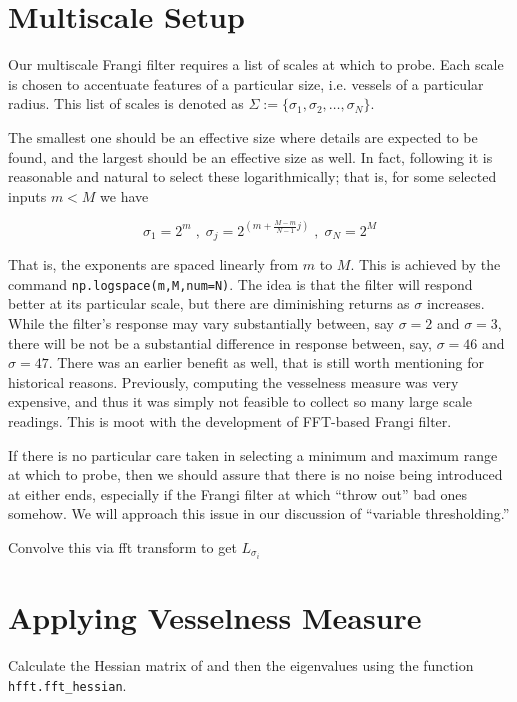 	
\section{Multiscale Setup}

	Our multiscale Frangi filter requires a list of scales at which to probe. Each scale is chosen to accentuate features of a particular size, i.e. vessels of a particular radius. This  list of scales is denoted as $\Sigma := \{ \sigma_1, \sigma_2, \dots, \sigma_N\}$. 
	 
	The smallest one should be an effective size where details are expected to be found, and the largest should be an effective size as well. In fact, following \cite{Koenderink} it is reasonable and natural to select these logarithmically; that is,
	for some selected inputs $m < M$ we have
	
	\begin{equation}
	\sigma_1 = 2^{m} \; , \; \sigma_{j} = 2^{\left(m+\frac{M-m}{N-1}j\right)} \; , \; \sigma_N = 2^{M} \end{equation}
	
	That is, the exponents are spaced linearly from $m$ to $M$. This is achieved by the command
	\texttt{np.logspace(m,M,num=N)}. The idea is that the filter will respond better at its particular scale, but there are diminishing returns as $\sigma$ increases. While the filter's response may vary substantially between, say $\sigma=2$ and $\sigma=3$, there will be not be a substantial difference in response between, say, $\sigma=46$ and $\sigma=47$. There was an earlier benefit as well, that is still worth mentioning for historical reasons. Previously, computing the vesselness measure was very expensive, and thus it was simply not feasible to collect so many large scale readings. This is moot with the development of FFT-based Frangi filter.
	
	If there is no particular care taken in selecting a minimum and maximum range at which to probe, then we should assure that there is no noise being introduced at either ends, especially if the Frangi filter at which   ``throw out'' bad ones somehow. We will approach this issue in our discussion of ``variable thresholding.''
	
	
	
	
	
	Convolve this via fft transform to get $L_{\sigma_i}$
	

\section{Applying Vesselness Measure}
Calculate the Hessian matrix of  and then the eigenvalues using the function \texttt{hfft.fft\_hessian}.

